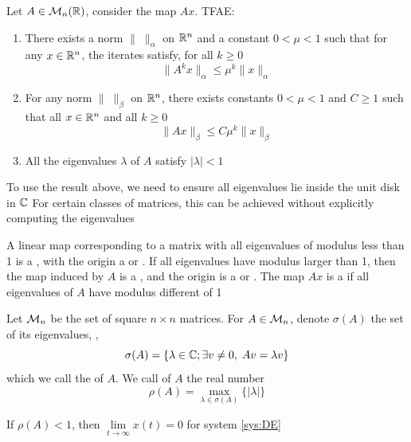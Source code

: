 \documentclass[aspectratio=169]{beamer}
\begin{document}
\begin{frame}
\begin{theorem}\label{th:TFAE_DE}
Let $A\in\mathcal{M}_n(\mathbb{R})$, consider the map $Ax$. TFAE:
\begin{enumerate}
\item There exists a norm $\|\;\|_\alpha$ on $\mathbb{R}^n$ and a constant $0<\mu<1$ such that for any $x\in\mathbb{R}^n$, the iterates satisfy, for all $k\geq 0$
\[
\|A^kx\|_\alpha\leq \mu^k\|x\|_\alpha
\]
\item For any norm $\|\;\|_\beta$ on $\mathbb{R}^n$, there exists constants $0<\mu<1$ and $C\geq 1$ such that all $x\in\mathbb{R}^n$ and all $k\geq 0$
\[
\|Ax\|_\beta\leq C\mu^k\|x\|_\beta
\]
\item All the eigenvalues $\lambda$ of $A$ satisfy $|\lambda|<1$
\end{enumerate}
\end{theorem}
\end{frame}

\begin{frame}
To use the result above, we need to ensure all eigenvalues lie inside the unit disk in $\mathbb{C}$
\vfill
For certain classes of matrices, this can be achieved without explicitly computing the eigenvalues
\vfill

A linear map corresponding to a matrix with all eigenvalues of modulus less than 1 is a , with the origin a  or . If all eigenvalues have modulus larger than 1, then the map induced by $A$ is a , and the origin is a  or .
The map $Ax$ is a  if all eigenvalues of $A$ have modulus different of 1
\end{frame}

\begin{frame}
\begin{definition}
Let $\mathcal{M}_n$ be the set of square $n\times n$ matrices. For $A\in\mathcal{M}_n$, denote $\sigma(A)$ the set of its eigenvalues, \ie,
\[
\sigma(A)=\left\{
\lambda\in\mathbb{C}; \exists v\neq 0,\; Av=\lambda v
\right\}
\]
which we call the  of $A$. We call  of $A$ the real number
\[
\rho(A)=\max_{\lambda\in\sigma(A)}\{|\lambda|\}
\]
\end{definition}
\vfill
\begin{theorem}\label{th:matrix_everywhere_rho_l_1_goes0}
If $\rho(A)<1$, then $\lim\limits_{t\to \infty} x(t)=0$ for system \eqref{sys:DE}
\end{theorem}
\end{frame}
\end{document}
